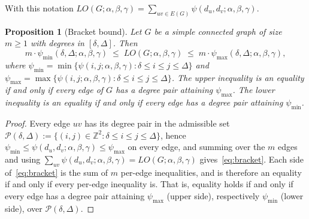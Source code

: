 \documentclass[a5paper, 10pt]{article}
\theoremstyle{plain}
\newtheorem{proposition}[theorem]{Proposition}
\theoremstyle{remark}
\theoremstyle{definition}
\newcommand{\Wuzi}{LO(G;\alpha,\beta,\gamma)}
\begin{document}
  With this notation $\Wuzi = \sum_{uv \in E(G)} \psi(d_u, d_v; \alpha,
  \beta, \gamma)$.

  \begin{proposition}[Bracket bound]\label{thm:bracket}
  Let $G$ be a simple connected graph of size $m \ge 1$ with
  degrees in $[\delta, \Delta]$. Then
  \begin{equation}\label{eq:bracket}
  m \cdot \psi_{\min}(\delta, \Delta; \alpha, \beta, \gamma)
  \;\le\; \Wuzi \;\le\;
  m \cdot \psi_{\max}(\delta, \Delta; \alpha, \beta, \gamma),
  \end{equation}
  where $\psi_{\min} = \min\{\psi(i, j; \alpha, \beta, \gamma)
                : \delta \le i \le j \le \Delta\}$
  and $\psi_{\max} = \max\{\psi(i, j; \alpha, \beta, \gamma)
                : \delta \le i \le j \le \Delta\}$. The upper
  inequality is an equality if and only if every edge of $G$ has a
  degree pair attaining $\psi_{\max}$. The lower
  inequality is an equality if and only if every edge has a degree
  pair attaining $\psi_{\min}$.
  \end{proposition}

  \begin{proof}
  Every edge $uv$ has its degree pair in the admissible set
  $\mathcal{P}(\delta, \Delta) := \{(i, j) \in \mathbb{Z}^2 : \delta \le
  i \le j \le \Delta\}$, hence
  $\psi_{\min} \le \psi(d_u, d_v; \alpha, \beta, \gamma) \le \psi_{\max}$
  on every edge, and summing over the $m$ edges and using
  $\sum_{uv} \psi(d_u, d_v; \alpha, \beta, \gamma) = \Wuzi$
  gives~\eqref{eq:bracket}. Each side of~\eqref{eq:bracket} is the sum
  of $m$ per-edge inequalities, and is therefore an equality if and only
  if every per-edge inequality is. That is, equality holds if and only
  if every edge has a degree pair attaining $\psi_{\max}$ (upper side),
  respectively $\psi_{\min}$ (lower side), over $\mathcal{P}(\delta, \Delta)$.
  \end{proof}
\end{document}
